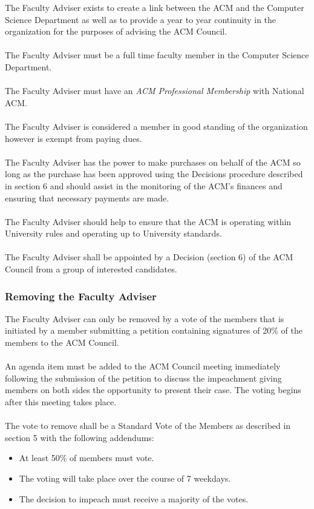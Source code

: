 \documentclass[12pt,titlepage]{article}
\begin{document}
The Faculty Adviser exists to create a link between the ACM and the Computer Science Department as well as to provide a year to year continuity in the organization for the purposes of advising the ACM Council.\\
\\
The Faculty Adviser must be a full time faculty member in the Computer Science Department.\\
\\
The Faculty Adviser must have an \emph{ACM Professional Membership} with National ACM.\\
\\
The Faculty Adviser is considered a member in good standing of the organization however is exempt from paying dues.\\
\\
The Faculty Adviser has the power to make purchases on behalf of the ACM so long as the purchase has been approved using the Decisions procedure described in section 6 and should assist in the monitoring of the ACM's finances and ensuring that necessary payments are made.\\
\\
The Faculty Adviser should help to ensure that the ACM is operating within University rules and operating up to University standards.\\
\\
The Faculty Adviser shall be appointed by a Decision (section 6) of the ACM Council from a group of interested candidates.

\subsubsection{Removing the Faculty Adviser}
The Faculty Adviser can only be removed by a vote of the members that is initiated by a member submitting a petition containing signatures of 20\% of the members to the ACM Council.\\
\\
An agenda item must be added to the ACM Council meeting immediately following the submission of the petition to discuss the impeachment giving members on both sides the opportunity to present their case. The voting begins after this meeting takes place.\\
\\
The vote to remove shall be a Standard Vote of the Members as described in section 5 with the following addendums:

\begin{itemize}
	\item At least 50\% of members must vote.
	\item The voting will take place over the course of 7 weekdays.
	\item The decision to impeach must receive a majority of the votes.
\end{itemize}
\end{document}
